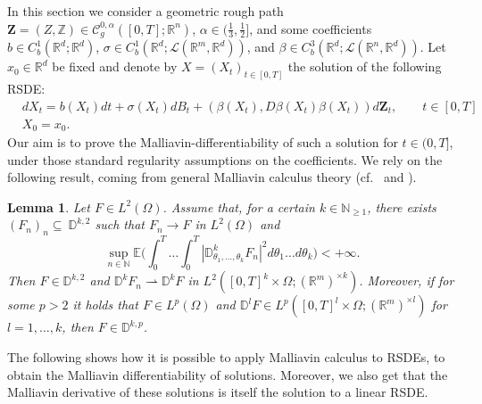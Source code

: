 \documentclass[11pt,a4paper]{article}
\newcommand{\R}{\mathbb{R}}
\newcommand{\E}{\mathbb{E}}
\theoremstyle{plain}
\newtheorem{lemma}[defn]{Lemma}
\begin{document}
In this section we consider a geometric rough path $\mathbf{Z}=(Z,\mathbb{Z}) \in \mathscr{C}^{0,\alpha}_g([0,T];\R^n)$, \linebreak $\alpha \in (\frac{1}{3},\frac{1}{2}]$, and some coefficients $b \in {C}^1_b(\R^d;\R^d)$, $\sigma \in {C}^1_b(\R^d;\mathscr{L}(\R^m,\R^d))$, and \linebreak $\beta \in {C}^3_b(\R^d;\mathscr{L}(\R^n,\R^d))$. 
Let $x_0 \in \R^d$ be fixed and denote by $X=(X_t)_{t \in [0,T]}$ the solution of the following RSDE: \begin{equation} \label{eq:solutionRSDEinmalliavinforRSDEs} \begin{aligned} &dX_t=b(X_t)dt+\sigma(X_t)dB_t+(\beta(X_t),D\beta(X_t)\beta(X_t))d\mathbf{Z}_t, \qquad t \in [0,T] \\ &X_0=x_0.\end{aligned}
\end{equation} 
Our aim is to prove the Malliavin-differentiability of such a solution {for $t \in (0,T]$}, under those standard regularity assumptions on the coefficients. We rely on the following result, coming from general Malliavin calculus theory (cf.\ \cite[Lemma 1.2.3]{nualart2006malliavin} and \cite[Proposition 1.5.5]{nualart2006malliavin}).
\begin{lemma} \label{lemma:Malliavin via approximation}
    Let $F\in L^2(\Omega)$. Assume that, for a certain $k \in \mathbb{N}_{\ge 1}$, there exists $(F_n)_n \subseteq~\mathbb{D}^{k,2}$ such that $F_n \to F$ in $L^2(\Omega)$ and \begin{equation*}
        \sup_{n\in \mathbb{N}} \E\Big(\int_0^T \dots \int_0^T |\mathbb{D}^k_{\theta_1,\dots,\theta_k}F_n|^2 d\theta_1 \dots d\theta_k\Big) <+\infty.
    \end{equation*}  
    Then $F \in \mathbb{D}^{k,2}$ and $\mathbb{D}^kF_n \rightharpoonup \mathbb{D}^kF$ in $L^2([0,T]^k\times\Omega;(\R^m)^{\times k})$. Moreover, if for some $p>2$ it holds that $F\in L^p(\Omega)$ and $\mathbb{D}^l F \in L^p([0,T]^l\times\Omega;(\R^m)^{\times l})$ for $l=1,\dots,k$, then $F \in \mathbb{D}^{k,p}$.
\end{lemma}

The following shows how it is possible to apply Malliavin calculus to RSDEs, to obtain the Malliavin differentiability of solutions.
Moreover, we also get that the Malliavin derivative of these solutions is itself the solution to a linear RSDE. 
\end{document}
